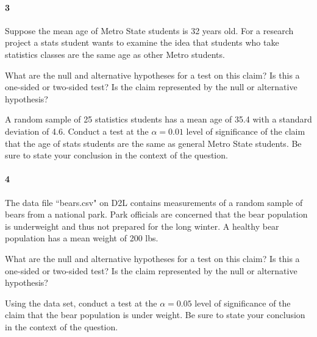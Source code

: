 \documentclass{article}
\begin{document}
\begin{flushleft}
\newpage
\paragraph{3} Suppose the mean age of Metro State students is 32 years old. For a research project a stats student wants to examine the idea that students who take statistics classes are the same age as other Metro students. 
\begin{enumalpha}
\item What are the null and alternative hypotheses for a test on this claim? Is this a one-sided or two-sided test? Is the claim represented by the null or alternative hypothesis?
\vspace{2.5in}
\item A random sample of 25 statistics students has a mean age of 35.4 with a standard deviation of 4.6. Conduct a test at the $\alpha = 0.01$ level of significance of the claim that the age of stats students are the same as general Metro State students. Be sure to state your conclusion in the context of the question.
\end{enumalpha}

\newpage
\paragraph{4} The data file ``bears.csv" on D2L contains measurements of a random sample of bears from a national park. Park officials are concerned that the bear population is underweight and thus not prepared for the long winter. A healthy bear population has a mean weight of 200 lbs.
\begin{enumalpha}
\item What are the null and alternative hypotheses for a test on this claim? Is this a one-sided or two-sided test? Is the claim represented by the null or alternative hypothesis?
\vspace{2.5in}
\item Using the data set, conduct a test at the $\alpha = 0.05$ level of significance of the claim that the bear population is under weight. Be sure to state your conclusion in the context of the question.
\end{enumalpha}



\end{flushleft}
\end{document}
